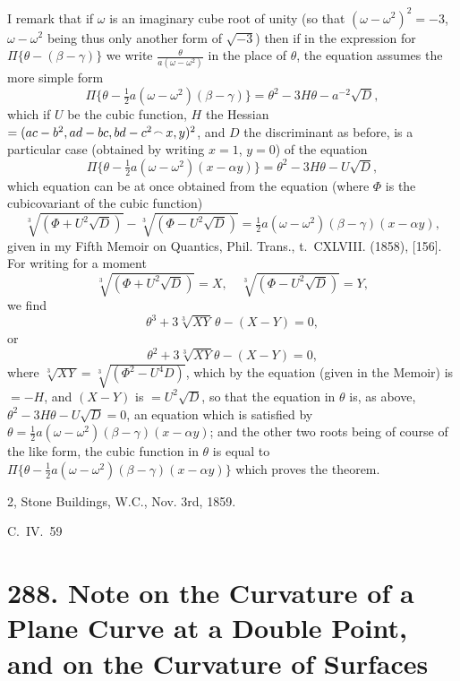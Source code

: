 \documentclass[11pt,a4paper]{book}
\begin{document}
I remark that if $\omega$ is an imaginary cube root of unity (so that $(\omega - \omega^2)^2 = -3$, $\omega - \omega^2$ being thus only another form of $\sqrt{-3}$) then if in the expression for $\Pi\{\theta - (\beta - \gamma)\}$ we write $\frac{\theta}{a(\omega - \omega^2)}$ in the place of $\theta$, the equation assumes the more simple form
\[
\Pi\{\theta - \tfrac{1}{2}a(\omega - \omega^2)(\beta - \gamma)\} = \theta^2 - 3H\theta - a^{-2}\sqrt{D},
\]
which if $U$ be the cubic function, $H$ the Hessian $= (ac - b^2, ad - bc, bd - c^2 \mathbin{\vcenter{\hbox{$\scriptstyle\!\frown$}}} x, y)^2$, and $D$ the discriminant as before, is a particular case (obtained by writing $x = 1$, $y = 0$) of the equation
\[
\Pi\{\theta - \tfrac{1}{2}a(\omega - \omega^2)(x - \alpha y)\} = \theta^2 - 3H\theta - U\sqrt{D},
\]
which equation can be at once obtained from the equation (where $\Phi$ is the cubicovariant of the cubic function)
\[
\sqrt[3]{(\Phi + U^2\sqrt{D})} - \sqrt[3]{(\Phi - U^2\sqrt{D})} = \tfrac{1}{2}a(\omega - \omega^2)(\beta - \gamma)(x - \alpha y),
\]
given in my Fifth Memoir on Quantics, Phil. Trans., t.~CXLVIII. (1858), [156]. For writing for a moment
\[
\sqrt[3]{(\Phi + U^2\sqrt{D})} = X,\quad \sqrt[3]{(\Phi - U^2\sqrt{D})} = Y,
\]
we find
\[
\theta^3 + 3\sqrt[3]{XY}\,\theta - (X - Y) = 0,
\]
or
\[
\theta^2 + 3\sqrt[3]{XY}\theta - (X - Y) = 0,
\]
where $\sqrt[3]{XY} = \sqrt[3]{(\Phi^2 - U^4D)}$, which by the equation (given in the Memoir) is $= -H$, and $(X - Y)$ is $= U^2\sqrt{D}$, so that the equation in $\theta$ is, as above, $\theta^2 - 3H\theta - U\sqrt{D} = 0$, an equation which is satisfied by $\theta = \tfrac{1}{2}a(\omega - \omega^2)(\beta - \gamma)(x - \alpha y)$; and the other two roots being of course of the like form, the cubic function in $\theta$ is equal to $\Pi\{\theta - \tfrac{1}{2}a(\omega - \omega^2)(\beta - \gamma)(x - \alpha y)\}$ which proves the theorem.

\hfill 2, Stone Buildings, W.C., Nov. 3rd, 1859.

\hfill C.~IV.\ 59



\newpage
\section*{288. Note on the Curvature of a Plane Curve at a Double Point, and on the Curvature of Surfaces}
\label{sec:288}
\end{document}
